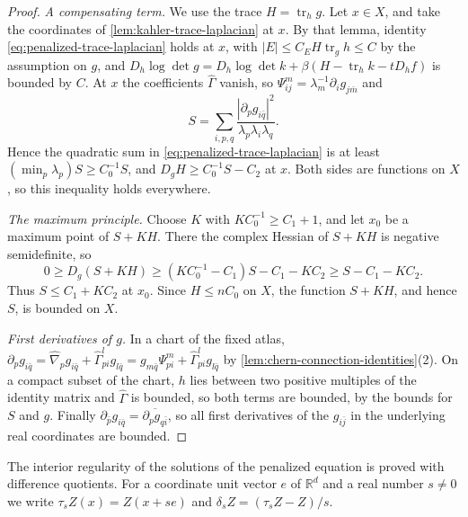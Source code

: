 \begin{proof}
\emph{A compensating term.} We use the trace $H=\operatorname{tr}_hg$. Let $x\in X$, and take the coordinates of \cref{lem:kahler-trace-laplacian} at $x$. By that lemma, identity \eqref{eq:penalized-trace-laplacian} holds at $x$, with $|E|\leq C_EH\operatorname{tr}_gh\leq C$ by the assumption on $g$, and $D_h\log\det g=D_h\log\det k+\beta(H-\operatorname{tr}_hk-tD_hf)$ is bounded by $C$. At $x$ the coefficients $\widehat\Gamma$ vanish, so $\Psi^m_{ij}=\lambda_m^{-1}\partial_ig_{j\bar m}$ and
\[
 S=\sum_{i,p,q}\frac{|\partial_pg_{i\bar q}|^2}{\lambda_p\lambda_i\lambda_q}.
\]
Hence the quadratic sum in \eqref{eq:penalized-trace-laplacian} is at least $(\min_p\lambda_p)S\geq C_0^{-1}S$, and $D_gH\geq C_0^{-1}S-C_2$ at $x$. Both sides are functions on $X$, so this inequality holds everywhere.

\emph{The maximum principle.} Choose $K$ with $KC_0^{-1}\geq C_1+1$, and let $x_0$ be a maximum point of $S+KH$. There the complex Hessian of $S+KH$ is negative semidefinite, so
\[
 0\geq D_g(S+KH)\geq(KC_0^{-1}-C_1)S-C_1-KC_2\geq S-C_1-KC_2.
\]
Thus $S\leq C_1+KC_2$ at $x_0$. Since $H\leq nC_0$ on $X$, the function $S+KH$, and hence $S$, is bounded on $X$.

\emph{First derivatives of $g$.} In a chart of the fixed atlas, $\partial_pg_{i\bar q}=\widehat\nabla_pg_{i\bar q}+\widehat\Gamma^l_{pi}g_{l\bar q}=g_{m\bar q}\Psi^m_{pi}+\widehat\Gamma^l_{pi}g_{l\bar q}$ by \cref{lem:chern-connection-identities}(2). On a compact subset of the chart, $h$ lies between two positive multiples of the identity matrix and $\widehat\Gamma$ is bounded, so both terms are bounded, by the bounds for $S$ and $g$. Finally $\partial_{\bar p}g_{i\bar q}=\overline{\partial_pg_{q\bar i}}$, so all first derivatives of the $g_{i\bar j}$ in the underlying real coordinates are bounded.
\end{proof}

The interior regularity of the solutions of the penalized equation is proved with difference quotients. For a coordinate unit vector $e$ of $\mathbb R^d$ and a real number $s\neq0$ we write $\tau_sZ(x)=Z(x+se)$ and $\delta_sZ=(\tau_sZ-Z)/s$.


